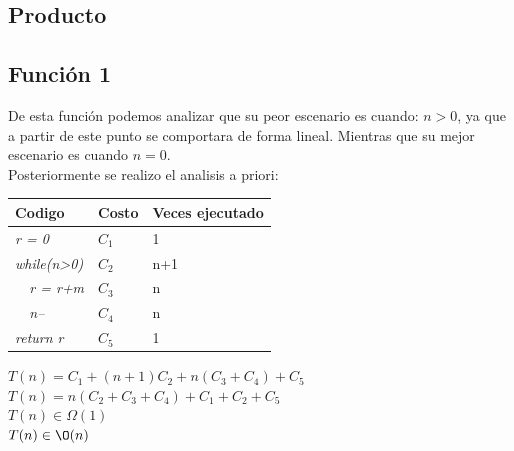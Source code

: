 \documentclass[spanish]{article}
\begin{document}
			\subsection{Producto}
				\subsection*{Función 1}
					De esta función podemos analizar que su peor escenario es cuando: $n>0$, ya que a partir de este punto se comportara de forma lineal. Mientras que su mejor escenario es cuando $n=0$.\\
					Posteriormente se realizo el analisis a priori:\\
					\begin{center}
						\begin{table}[H]
							\begin{tabular}{|l|l|l|}
								\hline
								\rowcolor[HTML]{FFCC67} 
								Codigo                           & Costo & Veces ejecutado \\ \hline
								\textit{r = 0}                    & $C_1$    & 1               \\ \hline
								\textit{while(n\textgreater{}0)} & $C_2$    & n+1             \\ \hline
								\textit{\  \  r = r+m}                 & $C_3$    & n               \\ \hline
								\textit{\  \  n--}                     & $C_4$    & n               \\ \hline
								\textit{return r}                & $C_5$    & 1               \\ \hline
							\end{tabular}
						\end{table}						
							$T(n) = C_1+(n+1)C_2+n(C_3+C_4)+C_5$\\							
							$T(n) = n(C_2+C_3+C_4)+C_1+C_2+C_5$\\							
							$T(n) \in \Omega(1)$\\							
							$T(n) \in \O(n)$\\
					\end{center}
\end{document}
